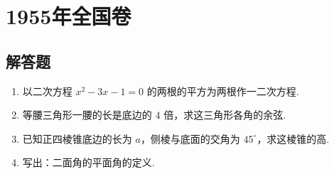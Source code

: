 \documentclass[UTF8,a4paper,oneside,11pt]{ctexbook}
\begin{document}
\mainmatter

\chapter{1955年全国卷}

\section{解答题}


\begin{problem}
\begin{enumerate}
\item 以二次方程 \(x^{2}-3x-1=0\) 的两根的平方为两根作一二次方程.
\item 等腰三角形一腰的长是底边的 \(4\) 倍，求这三角形各角的余弦.
\item 已知正四棱锥底边的长为 \(a\)，侧棱与底面的交角为 \(45^{\circ}\)，求这棱锥的高.
\item 写出：二面角的平面角的定义.
\end{enumerate}
\end{problem}
\end{document}
